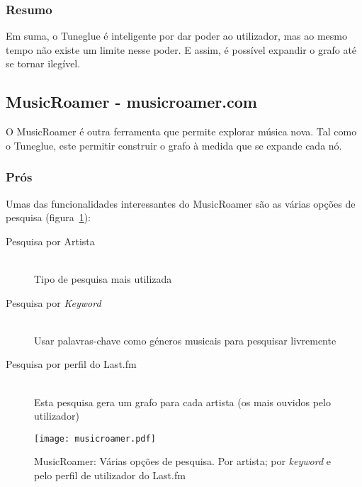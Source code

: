 \subsubsection{Resumo} %
\label{ssub:audiomap_resumo}

Em suma, o Tuneglue é inteligente por dar poder ao utilizador, mas ao mesmo tempo não existe um limite nesse poder.
E assim, é possível expandir o grafo até se tornar ilegível.





\subsection{MusicRoamer - musicroamer.com} %
\label{sub:musicroamer}

  O MusicRoamer é outra ferramenta que permite explorar música nova.
  Tal como o Tuneglue, este permitir construir o grafo à medida que se expande cada nó.



  \subsubsection{Prós} %
  \label{ssub:pros}

  
  Umas das funcionalidades interessantes do MusicRoamer são as várias opções de pesquisa (figura~\ref{fig:sota_musicroamer}):
  \begin{description}
    \item[Pesquisa por Artista] \hfill \\
      Tipo de pesquisa mais utilizada
    \item[Pesquisa por \emph{Keyword}] \hfill \\
      Usar palavras-chave como géneros musicais para pesquisar livremente
    \item[Pesquisa por perfil do Last.fm] \hfill \\
      Esta pesquisa gera um grafo para cada artista (os mais ouvidos pelo utilizador)
  \end{description}

  \begin{figure}[tb]
    \begin{center}
      \texttt{[image: musicroamer.pdf]}
    \end{center}
    \caption{MusicRoamer: Várias opções de pesquisa. Por artista; por \emph{keyword} e pelo perfil de utilizador do Last.fm}
    \label{fig:sota_musicroamer}
  \end{figure}


